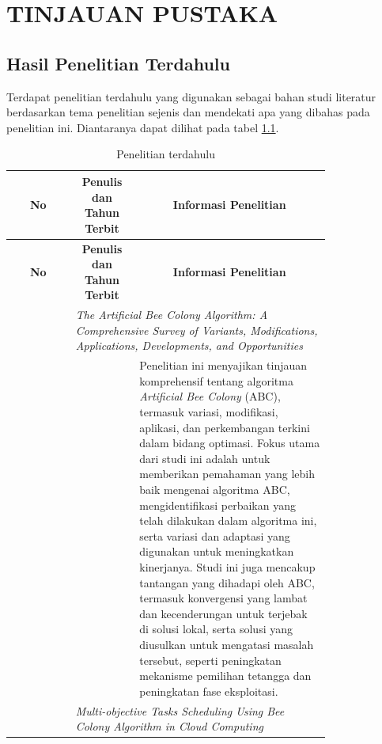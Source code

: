 \chapter{TINJAUAN PUSTAKA}

\section{Hasil Penelitian Terdahulu}
Terdapat penelitian terdahulu yang digunakan sebagai bahan studi literatur berdasarkan tema penelitian sejenis dan mendekati apa yang dibahas pada penelitian ini. Diantaranya dapat dilihat pada tabel \ref{table:Penelitian Terdahulu}.

\begin{longtable}{|c|m{0.2\linewidth}|m{0.6\linewidth}|}
  \caption{Penelitian terdahulu} \label{table:Penelitian Terdahulu} \\ \hline
  \multicolumn{1}{|c|}{\textbf{No}} & \multicolumn{1}{c|}{\textbf{Penulis dan Tahun Terbit}} & \multicolumn{1}{c|}{\textbf{Informasi Penelitian}} \\ \hline
  \endfirsthead
  \hline
  \multicolumn{1}{|c|}{\textbf{No}} & \multicolumn{1}{c|}{\textbf{Penulis dan Tahun Terbit}} & \multicolumn{1}{c|}{\textbf{Informasi Penelitian}} \\ \hline
  \endhead
  \hline
  \endfoot
  \hline
  \endlastfoot
  \multirow{2}{*}{1} & \multicolumn{2}{|p{\dimexpr0.9\linewidth}|}{\textit{The Artificial Bee Colony Algorithm: A Comprehensive Survey of Variants, Modifications, Applications, Developments, and Opportunities}} \\ \cline{2-3} 
                   & \multicolumn{1}{c|}{\parencite{Ibrahim2025}} & Penelitian ini menyajikan tinjauan komprehensif tentang algoritma \textit{Artificial Bee Colony} (ABC), termasuk variasi, modifikasi, aplikasi, dan perkembangan terkini dalam bidang optimasi. Fokus utama dari studi ini adalah untuk memberikan pemahaman yang lebih baik mengenai algoritma ABC, mengidentifikasi perbaikan yang telah dilakukan dalam algoritma ini, serta variasi dan adaptasi yang digunakan untuk meningkatkan kinerjanya. Studi ini juga mencakup tantangan yang dihadapi oleh ABC, termasuk konvergensi yang lambat dan kecenderungan untuk terjebak di solusi lokal, serta solusi yang diusulkan untuk mengatasi masalah tersebut, seperti peningkatan mekanisme pemilihan tetangga dan peningkatan fase eksploitasi. \\ \hline
  \pagebreak
  \multirow{2}{*}{2} & \multicolumn{2}{|p{\dimexpr0.9\linewidth}|}{\textit{Multi-objective Tasks Scheduling Using Bee Colony Algorithm in Cloud Computing}} \\ \cline{2-3}

\end{longtable}

